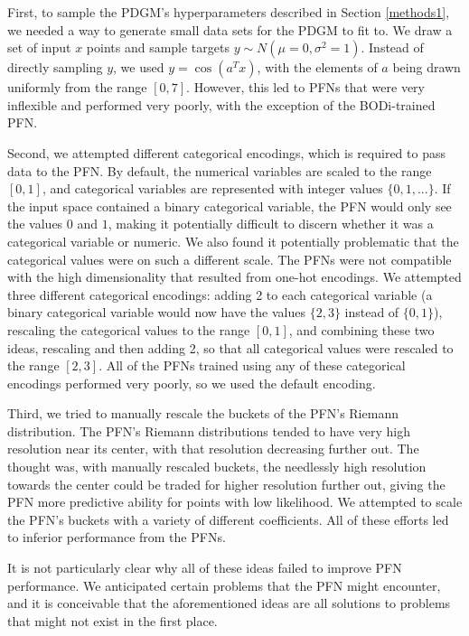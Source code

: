 \documentclass[12pt,twoside]{reedthesis}
\begin{document}
First, to sample the PDGM's hyperparameters described in Section \ref{methods1}, we needed a way to generate small data sets for the PDGM to fit to. We draw a set of input \(x\) points and sample targets \(y\sim N(\mu=0,\sigma^2=1)\). Instead of directly sampling \(y\), we used \(y=\cos(a^T x)\), with the elements of \(a\) being drawn uniformly from the range \([0,7]\). However, this led to PFNs that were very inflexible and performed very poorly, with the exception of the BODi-trained PFN.

Second, we attempted different categorical encodings, which is required to pass data to the PFN. By default, the numerical variables are scaled to the range \([0,1]\), and categorical variables are represented with integer values \(\{0,1,...\}\). If the input space contained a binary categorical variable, the PFN would only see the values \(0\) and \(1\), making it potentially difficult to discern whether it was a categorical variable or numeric. We also found it potentially problematic that the categorical values were on such a different scale. The PFNs were not compatible with the high dimensionality that resulted from one-hot encodings. We attempted three different categorical encodings: adding 2 to each categorical variable (a binary categorical variable would now have the values \(\{2,3\}\) instead of \(\{0,1\}\)), rescaling the categorical values to the range \([0,1]\), and combining these two ideas, rescaling and then adding 2, so that all categorical values were rescaled to the range \([2,3]\). All of the PFNs trained using any of these categorical encodings performed very poorly, so we used the default encoding.

Third, we tried to manually rescale the buckets of the PFN's Riemann distribution. The PFN's Riemann distributions tended to have very high resolution near its center, with that resolution decreasing further out. The thought was, with manually rescaled buckets, the needlessly high resolution towards the center could be traded for higher resolution further out, giving the PFN more predictive ability for points with low likelihood. We attempted to scale the PFN's buckets with a variety of different coefficients. All of these efforts led to inferior performance from the PFNs.

It is not particularly clear why all of these ideas failed to improve PFN performance. We anticipated certain problems that the PFN might encounter, and it is conceivable that the aforementioned ideas are all solutions to problems that might not exist in the first place.
\end{document}
